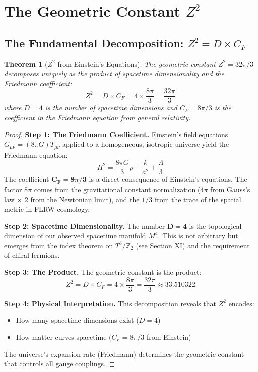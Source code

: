 \documentclass[11pt,a4paper]{article}
\theoremstyle{plain}
\newtheorem{theorem}{Theorem}[section]
\theoremstyle{definition}
\theoremstyle{remark}
\newcommand{\CF}{C_F}
\newcommand{\Tthree}{T^3}
\newcommand{\Ztwo}{\mathbb{Z}_2}
\begin{document}
\section{The Geometric Constant $Z^2$}

\subsection{The Fundamental Decomposition: $Z^2 = D \times \CF$}

\begin{theorem}[$Z^2$ from Einstein's Equations]
The geometric constant $Z^2 = 32\pi/3$ decomposes uniquely as the product of spacetime dimensionality and the Friedmann coefficient:
\begin{equation}
Z^2 = D \times \CF = 4 \times \frac{8\pi}{3} = \frac{32\pi}{3}
\end{equation}
where $D = 4$ is the number of spacetime dimensions and $\CF = 8\pi/3$ is the coefficient in the Friedmann equation from general relativity.
\end{theorem}

\begin{proof}
\textbf{Step 1: The Friedmann Coefficient.} Einstein's field equations $G_{\mu\nu} = (8\pi G)T_{\mu\nu}$ applied to a homogeneous, isotropic universe yield the Friedmann equation:
\begin{equation}
H^2 = \frac{8\pi G}{3}\rho - \frac{k}{a^2} + \frac{\Lambda}{3}
\end{equation}
The coefficient $\mathbf{\CF = 8\pi/3}$ is a direct consequence of Einstein's equations. The factor $8\pi$ comes from the gravitational constant normalization ($4\pi$ from Gauss's law $\times$ 2 from the Newtonian limit), and the $1/3$ from the trace of the spatial metric in FLRW cosmology.

\textbf{Step 2: Spacetime Dimensionality.} The number $\mathbf{D = 4}$ is the topological dimension of our observed spacetime manifold $M^4$. This is not arbitrary but emerges from the index theorem on $\Tthree/\Ztwo$ (see Section XI) and the requirement of chiral fermions.

\textbf{Step 3: The Product.} The geometric constant is the product:
\begin{equation}
Z^2 = D \times \CF = 4 \times \frac{8\pi}{3} = \frac{32\pi}{3} \approx 33.510322
\end{equation}

\textbf{Step 4: Physical Interpretation.} This decomposition reveals that $Z^2$ encodes:
\begin{itemize}
  \item How many spacetime dimensions exist ($D = 4$)
  \item How matter curves spacetime ($\CF = 8\pi/3$ from Einstein)
\end{itemize}
The universe's expansion rate (Friedmann) determines the geometric constant that controls all gauge couplings.
\end{proof}
\end{document}
